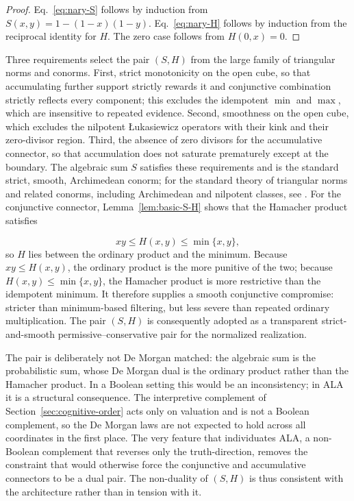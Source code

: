 \documentclass[reqno,final]{amsart}
\theoremstyle{definition}
\theoremstyle{plain}
\theoremstyle{remark}
\begin{document}
\begin{proof}
Eq.~\eqref{eq:nary-S} follows by induction from \(S(x,y)=1-(1-x)(1-y)\). Eq.~\eqref{eq:nary-H} follows by induction from the reciprocal identity for \(H\). The zero case follows from \(H(0,x)=0\).
\end{proof}

Three requirements select the pair \((S,H)\) from the large family of triangular norms and conorms. First, strict monotonicity on the open cube, so that accumulating further support strictly rewards it and conjunctive combination strictly reflects every component; this excludes the idempotent \(\min\) and \(\max\), which are insensitive to repeated evidence. Second, smoothness on the open cube, which excludes the nilpotent Łukasiewicz operators with their kink and their zero-divisor region. Third, the absence of zero divisors for the accumulative connector, so that accumulation does not saturate prematurely except at the boundary. The algebraic sum \(S\) satisfies these requirements and is the standard strict, smooth, Archimedean conorm; for the standard theory of triangular norms and related conorms, including Archimedean and nilpotent classes, see \cite{KlementMesiarPap2000}. For the conjunctive connector, Lemma~\ref{lem:basic-S-H} shows that the Hamacher product satisfies

\[
xy\le H(x,y)\le \min\{x,y\},
\]
so \(H\) lies between the ordinary product and the minimum. Because \(xy\leq H(x,y)\), the ordinary product is the more punitive of the two; because \(H(x,y)\leq\min\{x,y\}\), the Hamacher product is more restrictive than the idempotent minimum. It therefore supplies a smooth conjunctive compromise: stricter than minimum-based filtering, but less severe than repeated ordinary multiplication. The pair \((S,H)\) is consequently adopted as a transparent strict-and-smooth permissive--conservative pair for the normalized realization.

The pair is deliberately not De Morgan matched: the algebraic sum is the probabilistic sum, whose De Morgan dual is the ordinary product rather than the Hamacher product. In a Boolean setting this would be an inconsistency; in ALA it is a structural consequence. The interpretive complement of Section~\ref{sec:cognitive-order} acts only on valuation and is not a Boolean complement, so the De Morgan laws are not expected to hold across all coordinates in the first place. The very feature that individuates ALA, a non-Boolean complement that reverses only the truth-direction, removes the constraint that would otherwise force the conjunctive and accumulative connectors to be a dual pair. The non-duality of \((S,H)\) is thus consistent with the architecture rather than in tension with it.
\end{document}
